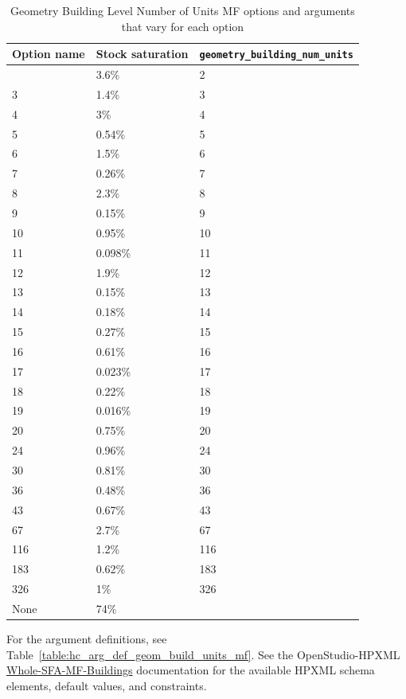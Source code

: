 \begin{longtable}[]{ |p{}|p{4cm}|p{4cm}| }
\caption{Geometry Building Level Number of Units MF options and arguments that vary for each option} \label{table:hc_opt_geom_build_units_mf}  \\
\toprule\noalign{}
Option name & Stock saturation &
\texttt{geometry\_building\_num\_units} \\
\midrule\noalign{}
\endhead
\bottomrule\noalign{}
\endlastfoot
2 & 3.6\% & 2 \\ \hline
3 & 1.4\% & 3 \\ \hline
4 & 3\% & 4 \\ \hline
5 & 0.54\% & 5 \\ \hline
6 & 1.5\% & 6 \\ \hline
7 & 0.26\% & 7 \\ \hline
8 & 2.3\% & 8 \\ \hline
9 & 0.15\% & 9 \\ \hline
10 & 0.95\% & 10 \\ \hline
11 & 0.098\% & 11 \\ \hline
12 & 1.9\% & 12 \\ \hline
13 & 0.15\% & 13 \\ \hline
14 & 0.18\% & 14 \\ \hline
15 & 0.27\% & 15 \\ \hline
16 & 0.61\% & 16 \\ \hline
17 & 0.023\% & 17 \\ \hline
18 & 0.22\% & 18 \\ \hline
19 & 0.016\% & 19 \\ \hline
20 & 0.75\% & 20 \\ \hline
24 & 0.96\% & 24 \\ \hline
30 & 0.81\% & 30 \\ \hline
36 & 0.48\% & 36 \\ \hline
43 & 0.67\% & 43 \\ \hline
67 & 2.7\% & 67 \\ \hline
116 & 1.2\% & 116 \\ \hline
183 & 0.62\% & 183 \\ \hline
326 & 1\% & 326 \\ \hline
None & 74\% & \\ \hline
\end{longtable}

For the argument definitions, see Table~\ref{table:hc_arg_def_geom_build_units_mf}. See the OpenStudio-HPXML \href{https://openstudio-hpxml.readthedocs.io/en/v1.8.1/workflow_inputs.html#whole-sfa-mf-buildings}{Whole-SFA-MF-Buildings} documentation for the available HPXML schema elements, default values, and constraints.

